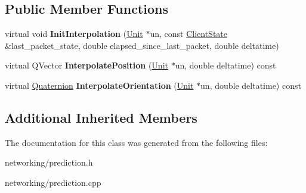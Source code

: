 \subsection*{Public Member Functions}
\begin{DoxyCompactItemize}
\item 
virtual void {\bfseries Init\+Interpolation} (\hyperlink{classUnit}{Unit} $\ast$un, const \hyperlink{classClientState}{Client\+State} \&last\+\_\+packet\+\_\+state, double elapsed\+\_\+since\+\_\+last\+\_\+packet, double deltatime)\hypertarget{classNullPrediction_a3a39b9576745a1825d1812743bd1f873}{}\label{classNullPrediction_a3a39b9576745a1825d1812743bd1f873}

\item 
virtual Q\+Vector {\bfseries Interpolate\+Position} (\hyperlink{classUnit}{Unit} $\ast$un, double deltatime) const \hypertarget{classNullPrediction_aefb93ac107b3c5137530428a11dd1946}{}\label{classNullPrediction_aefb93ac107b3c5137530428a11dd1946}

\item 
virtual \hyperlink{structQuaternion}{Quaternion} {\bfseries Interpolate\+Orientation} (\hyperlink{classUnit}{Unit} $\ast$un, double deltatime) const \hypertarget{classNullPrediction_aebf20f339d381ad094087203a750ba26}{}\label{classNullPrediction_aebf20f339d381ad094087203a750ba26}

\end{DoxyCompactItemize}
\subsection*{Additional Inherited Members}


The documentation for this class was generated from the following files\+:\begin{DoxyCompactItemize}
\item 
networking/prediction.\+h\item 
networking/prediction.\+cpp\end{DoxyCompactItemize}
